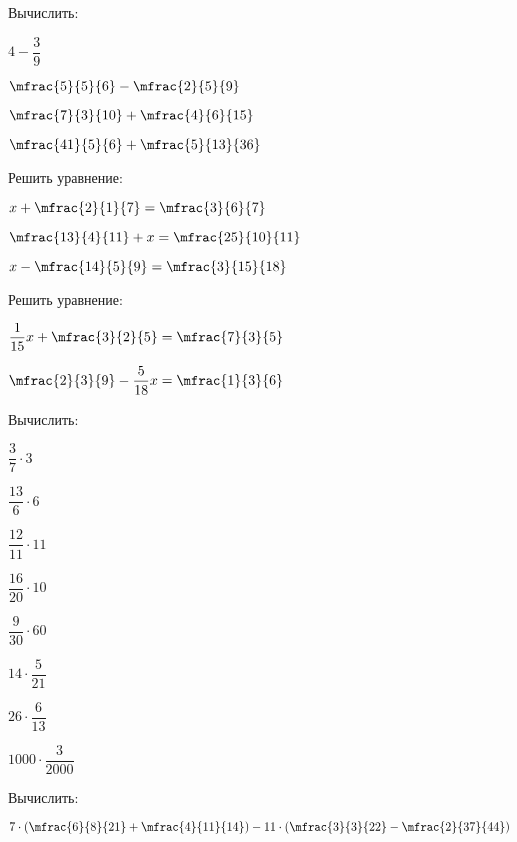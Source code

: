 \begin{class}[number=4]
	\begin{listofex}
		\item Вычислить:
		\begin{enumcols}[itemcolumns=4]
			\item \( 4-\dfrac{3}{9} \)
			\item \( \mfrac{5}{5}{6}-\mfrac{2}{5}{9} \)
			\item \( \mfrac{7}{3}{10}+\mfrac{4}{6}{15} \)
			\item \( \mfrac{41}{5}{6}+\mfrac{5}{13}{36} \)
		\end{enumcols}
		\item Решить уравнение:
		\begin{enumcols}[itemcolumns=3]
			\item \( x+\mfrac{2}{1}{7}=\mfrac{3}{6}{7} \)
			\item \( \mfrac{13}{4}{11}+x=\mfrac{25}{10}{11} \)
			\item \( x-\mfrac{14}{5}{9}=\mfrac{3}{15}{18} \)
		\end{enumcols}
		\item Решить уравнение:
		\begin{enumcols}[itemcolumns=2]
			\item \( \dfrac{1}{15}x+\mfrac{3}{2}{5}=\mfrac{7}{3}{5} \)
			\item \( \mfrac{2}{3}{9}-\dfrac{5}{18}x=\mfrac{1}{3}{6} \)
		\end{enumcols}
		\item Вычислить:
		\begin{enumcols}[itemcolumns=4]
			\item \( \dfrac{3}{7}\cdot3 \)
			\item \( \dfrac{13}{6}\cdot6 \)
			\item \( \dfrac{12}{11}\cdot11 \)
			\item \( \dfrac{16}{20}\cdot10 \)
			\item \( \dfrac{9}{30}\cdot60 \)
			\item \( 14\cdot\dfrac{5}{21} \)
			\item \( 26\cdot\dfrac{6}{13} \)
			\item \( 1000\cdot\dfrac{3}{2000} \)
		\end{enumcols}
		\item Вычислить:
		\begin{enumcols}[itemcolumns=2]
			\item \( 7\cdot\left( \mfrac{6}{8}{21}+\mfrac{4}{11}{14} \right)-11\cdot\left( \mfrac{3}{3}{22}-\mfrac{2}{37}{44} \right) \)

\end{enumcols}
\end{listofex}
\end{class}
